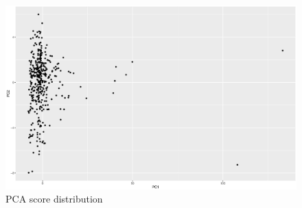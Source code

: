 \documentclass[a4paper,12pt]{article}
\begin{document}
    \begin{figure}[H]           
    \centering
    \caption{PCA score distribution}
    \label{fig:pcascore}
    \includegraphics[width=\textwidth]{figures/A2_pcascore.eps}
    \end{figure}
\end{document}
